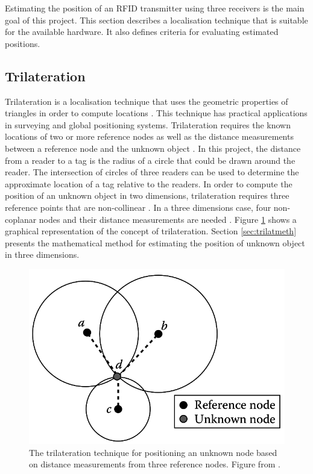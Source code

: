 Estimating the position of an RFID transmitter using three receivers is the main goal of this project. This section describes a localisation technique that is suitable for the available hardware. It also defines criteria for evaluating estimated positions. 

\subsection{Trilateration}
\label{sec:trilatback}

Trilateration is a localisation technique that uses the geometric properties of triangles in order to compute locations \cite{Hightower2001c}. This technique has practical applications in surveying and global positioning systems. Trilateration requires the known locations of two or more reference nodes as well as the distance measurements between a reference node and the unknown object \cite[p. 280]{Zhang2009}. In this project, the distance from a reader to a tag is the radius of a circle that could be drawn around the reader. The intersection of circles of three readers can be used to determine the approximate location of a tag relative to the readers. In order to compute the position of an unknown object in two dimensions, trilateration requires three reference points that are non-collinear \cite{Zhang2009}. In a three dimensions case, four non-coplanar nodes and their distance measurements are needed \cite{Hightower2001c}. Figure \ref{fig:trilat} shows  a graphical representation of the concept of trilateration. Section \ref{sec:trilatmeth} presents the mathematical method for estimating the position of unknown object in three dimensions. 

\begin{figure}[h]
	\begin{center}
		\includegraphics[width=.5\textwidth]{figures/trilat}
		\caption{The trilateration technique for positioning an unknown node based on distance measurements from three reference nodes. Figure from \cite[p. 281]{Zhang2009}.}
		\label{fig:trilat}
	\end{center}
\end{figure}


